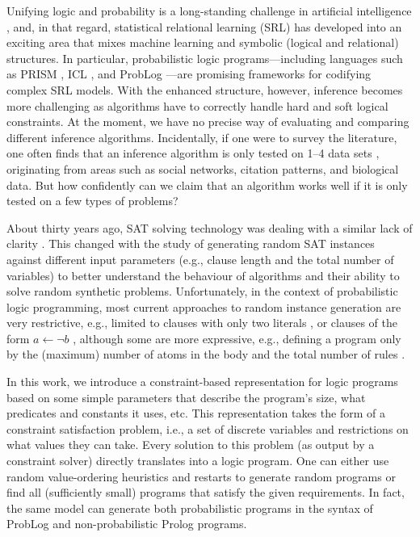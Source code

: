 \documentclass[runningheads]{llncs}
\begin{document}
Unifying logic and probability is a long-standing challenge in artificial
intelligence \cite{DBLP:journals/cacm/Russell15}, and, in that regard,
statistical relational learning (SRL) has developed into an exciting area that
mixes machine learning and symbolic (logical and relational) structures. In
particular, probabilistic logic programs---including languages such as PRISM
\cite{DBLP:conf/ijcai/SatoK97}, ICL \cite{DBLP:journals/ai/Poole97}, and ProbLog
\cite{DBLP:conf/ijcai/RaedtKT07}---are promising frameworks for codifying
complex SRL models. With the enhanced structure, however, inference becomes more
challenging as algorithms have to correctly handle hard and soft logical
constraints. At the moment, we have no precise way of evaluating and comparing
different inference algorithms. Incidentally, if one were to survey the
literature, one often finds that an inference algorithm is only tested on 1--4
data sets
\cite{DBLP:conf/ecai/BruynoogheMKGVJR10,DBLP:journals/tplp/KimmigDRCR11,DBLP:conf/ijcai/VlasselaerBKMR15},
originating from areas such as social networks, citation patterns, and
biological data. But how confidently can we claim that an algorithm works well
if it is only tested on a few types of problems?

About thirty years ago, SAT solving technology was dealing with a similar lack
of clarity \cite{DBLP:journals/ai/SelmanML96}. This changed with the study of
generating random SAT instances against different input parameters (e.g.,
clause length and the total number of variables) to better understand the
behaviour of algorithms and their ability to solve random synthetic problems.
Unfortunately, in the context of probabilistic logic programming, most current
approaches to random instance generation are very restrictive, e.g., limited to
clauses with only two literals \cite{DBLP:conf/lpnmr/NamasivayamT09}, or clauses
of the form $a \gets \neg b$ \cite{DBLP:journals/tocl/WenWSL16}, although some
are more expressive, e.g., defining a program only by the (maximum) number of
atoms in the body and the total number of rules \cite{DBLP:conf/iclp/ZhaoL03}.

In this work, we introduce a constraint-based representation for logic programs
based on some simple parameters that describe the program's size, what
predicates and constants it uses, etc. This representation takes the form of a
constraint satisfaction problem, i.e., a set of discrete variables and
restrictions on what values they can take. Every solution to this problem (as
output by a constraint solver) directly translates into a logic program. One can
either use random value-ordering heuristics and restarts to generate random
programs or find all (sufficiently small) programs that satisfy the given
requirements. In fact, the same model can generate both probabilistic programs
in the syntax of ProbLog \cite{DBLP:conf/ijcai/RaedtKT07} and non-probabilistic
Prolog programs.
\end{document}
